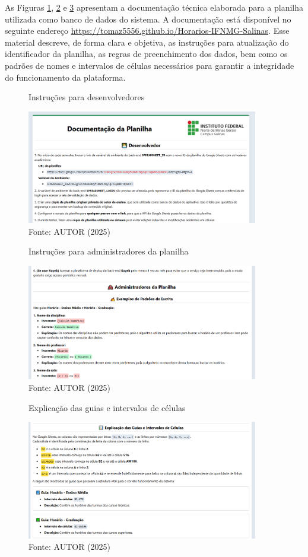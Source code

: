 As Figuras \ref{fig_doc_1}, \ref{fig_doc_2} e \ref{fig_doc_3} apresentam a documentação técnica elaborada para a planilha utilizada como banco de dados do sistema. A documentação está disponível no seguinte endereço \url{https://tomaz5556.github.io/Horarios-IFNMG-Salinas}. Esse material descreve, de forma clara e objetiva, as instruções para atualização do identificador da planilha, as regras de preenchimento dos dados, bem como os padrões de nomes e intervalos de células necessários para garantir a integridade do funcionamento da plataforma.

\begin{figure}[htb]
    \centering
    \caption{Instruções para desenvolvedores}
    \includegraphics[width=0.9\textwidth]{Figuras/doc-1.png}
    \caption*{Fonte: AUTOR (2025)}
    \label{fig_doc_1}
\end{figure}

\begin{figure}[htb]
    \centering
    \caption{Instruções para administradores da planilha}
    \includegraphics[width=0.9\textwidth]{Figuras/doc-2.png}
    \caption*{Fonte: AUTOR (2025)}
    \label{fig_doc_2}
\end{figure}

\begin{figure}[htb]
    \centering
    \caption{Explicação das guias e intervalos de células}
    \includegraphics[width=0.9\textwidth]{Figuras/doc-3.png}
    \caption*{Fonte: AUTOR (2025)}
    \label{fig_doc_3}
\end{figure}

